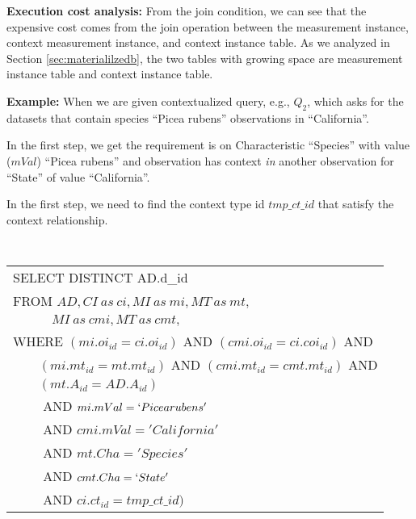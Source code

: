 \documentclass[conference]{IEEEtran}
\begin{document}
{\bf Execution cost analysis:} From the join condition, we can see that the expensive cost comes from
the join operation between the measurement instance, context
measurement instance, and context instance table. 
As we analyzed in Section \ref{sec:materialilzedb}, the two tables with
growing space are measurement instance table and context instance
table. 
 
{\bf Example:} When we are given contextualized query, e.g., $Q_2$, which asks for
the datasets that contain species ``Picea rubens'' observations in
``California''. 

In the first step, we get the requirement is on Characteristic
``Species'' with value ($mVal$) ``Picea rubens'' and observation has context {\em in}
another observation for ``State'' of value ``California''. 



In the first step, we need to find the context type id $tmp\_ct\_id$
that satisfy the context relationship. 

\vspace{0.1in}
{\tt 
\begin{tabular}{l}
SELECT DISTINCT AD.d_{id}\\
FROM $AD, CI~as~ci, MI~as~mi, MT~as~mt,$ \\
$\quad\qquad MI~as~cmi, MT~as~cmt,$ \\
WHERE $(mi.oi_{id}=ci.oi_{id})$ AND $(cmi.oi_{id}=ci.coi_{id})$ AND\\
$\qquad (mi.mt_{id}=mt.mt_{id})$ AND $(cmi.mt_{id}=cmt.mt_{id})$ AND\\
$\qquad (mt.A_{id}=AD.A_{id})$\\
$\qquad$ AND $mi.mVal=`Picea rubens'$ \\
$\qquad$ AND $cmi.mVal='California'$\\
$\qquad$ AND $mt.Cha = 'Species'$\\
$\qquad$ AND $cmt.Cha=`State'$\\
$\qquad$ AND $ci.ct_{id} = tmp\_ct\_id)$\\
\end{tabular}
}
\vspace{0.1in}


\end{document}
